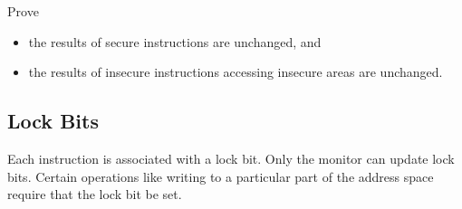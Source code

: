 \documentclass[12pt, letterpaper]{article}
\begin{document}
Prove
\begin{itemize}
\item the results of secure instructions are unchanged, and
\item the results of insecure instructions accessing insecure areas are unchanged.
  \end{itemize}

\subsection{Lock Bits}

Each instruction is associated with a lock bit.
Only the monitor can update lock bits.
Certain operations like writing to a particular part of the address space
require that the lock bit be set. 
\end{document}
